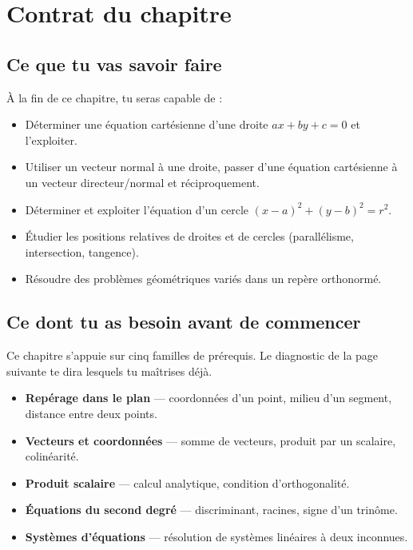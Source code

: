 \section*{Contrat du chapitre}

\subsection*{Ce que tu vas savoir faire}

À la fin de ce chapitre, tu seras capable de :

\begin{itemize}
  \item[\textbf{C1}] Déterminer une équation cartésienne d'une droite $ax + by + c = 0$ et l'exploiter.
  \item[\textbf{C2}] Utiliser un vecteur normal à une droite, passer d'une équation cartésienne à un vecteur directeur/normal et réciproquement.
  \item[\textbf{C3}] Déterminer et exploiter l'équation d'un cercle $(x - a)^2 + (y - b)^2 = r^2$.
  \item[\textbf{C4}] Étudier les positions relatives de droites et de cercles (parallélisme, intersection, tangence).
  \item[\textbf{C5}] Résoudre des problèmes géométriques variés dans un repère orthonormé.
\end{itemize}

\subsection*{Ce dont tu as besoin avant de commencer}

Ce chapitre s'appuie sur cinq familles de prérequis. Le diagnostic de la page suivante te dira lesquels tu maîtrises déjà.

\begin{itemize}
  \item[\textbf{R1}] \textbf{Repérage dans le plan} — coordonnées d'un point, milieu d'un segment, distance entre deux points.
  \item[\textbf{R2}] \textbf{Vecteurs et coordonnées} — somme de vecteurs, produit par un scalaire, colinéarité.
  \item[\textbf{R3}] \textbf{Produit scalaire} — calcul analytique, condition d'orthogonalité.
  \item[\textbf{R4}] \textbf{Équations du second degré} — discriminant, racines, signe d'un trinôme.
  \item[\textbf{R5}] \textbf{Systèmes d'équations} — résolution de systèmes linéaires à deux inconnues.
\end{itemize}

